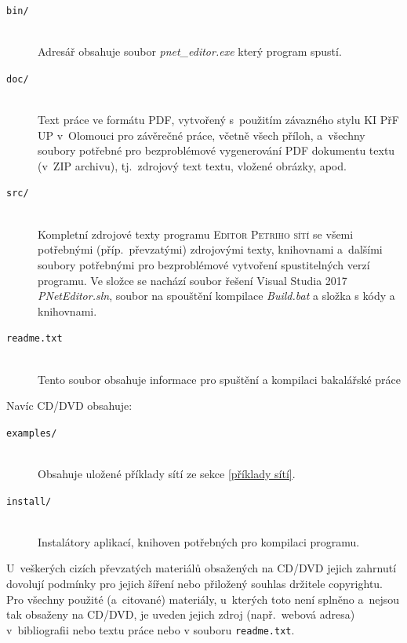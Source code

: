 \documentclass[
  biblatex,
  glossaries,
  printversion
]{kidiplom}
\begin{document}
\begin{description}
  \item[\texttt{bin/}] \hfill \\
        Adresář obsahuje soubor \textit{pnet\_editor.exe} který program spustí. 

  \item[\texttt{doc/}] \hfill \\
        Text práce ve formátu PDF, vytvořený s~použitím závazného stylu KI
        PřF UP v~Olomouci pro závěrečné práce, včetně všech příloh,
        a~všechny soubory potřebné pro bezproblémové vygenerování PDF
        dokumentu textu (v~ZIP archivu), tj.~zdrojový text textu, vložené
        obrázky, apod.

  \item[\texttt{src/}] \hfill \\
        Kompletní zdrojové texty programu \textsc{Editor Petriho sítí} 
        se všemi potřebnými (příp.~převzatými) zdrojovými
        texty, knihovnami a~dalšími soubory potřebnými pro bezproblémové
        vytvoření spustitelných verzí programu. Ve složce se nachází
        soubor řešení Visual Studia 2017 \textit{PNetEditor.sln},
        soubor na spouštění kompilace \textit{Build.bat} a
        složka s kódy a knihovnami.
        

  \item[\texttt{readme.txt}] \hfill \\
        Tento soubor obsahuje informace pro spuštění a kompilaci bakalářské práce 

\end{description}

Navíc CD/DVD obsahuje:

\begin{description}

  \item[\texttt{examples/}] \hfill \\
        Obsahuje uložené příklady sítí ze sekce \ref{příklady sítí}.

  \item[\texttt{install/}] \hfill \\
        Instalátory aplikací, knihoven potřebných pro kompilaci programu.

\end{description}

U~veškerých cizích převzatých materiálů obsažených na CD/DVD jejich
zahrnutí dovolují podmínky pro jejich šíření nebo přiložený souhlas
držitele copyrightu. Pro všechny použité (a~citované) materiály,
u~kterých toto není splněno a~nejsou tak obsaženy na CD/DVD, je uveden
jejich zdroj (např.~webová adresa) v~bibliografii nebo textu práce
nebo v souboru \texttt{readme.txt}.
\end{document}
